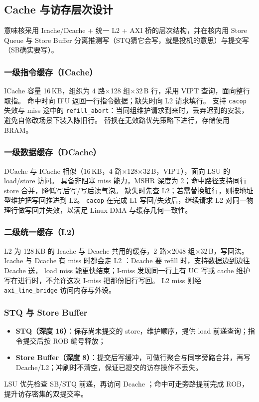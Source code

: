 \subsection{Cache 与访存层次设计}

意味核采用 Icache/Dcache + 统一 L2 + AXI 桥的层次结构，并在核内用 Store Queue 与 Store Buffer 分离推测写（STQ猜它会写，就是投机的意思）与提交写（SB确实要写）。

\subsubsection{一级指令缓存（ICache）}

ICache 容量 16\,KB，组织为 4 路$\times$128 组$\times$32\,B 行，采用 VIPT 查询，面向整行取指。
命中时向 IFU 返回一行指令数据；缺失时向 L2 请求填行。
支持 \texttt{cacop} 失效与 miss 途中的 \texttt{refill\_abort}：当同组维护请求到来时，丢弃迟到的安装，避免自修改场景下装入陈旧行。
替换在无效路优先策略下进行，存储使用 BRAM。

\subsubsection{一级数据缓存（DCache）}

DCache 与 ICache 相似（16\,KB，4 路$\times$128$\times$32\,B，VIPT），面向 LSU 的 load/store 访问。
具备非阻塞 miss 能力，MSHR 深度为 2；命中路径支持同行 store 合并，降低写后写/写后读气泡。
缺失时先查 L2；若需替换脏行，则按地址型维护把写回推进到 L2。
\texttt{cacop} 在完成 L1 写回/失效后，继续请求 L2 对同一物理行做写回并失效，以满足 Linux DMA 与缓存几何一致性。

\subsubsection{二级统一缓存（L2）}

L2 为 128\,KB 的 Icache 与 Dcache 共用的缓存，2 路$\times$2048 组$\times$32\,B，写回法。
Icache 与 Dcache 有 miss 时都会走 L2 ：Dcache 要 refill 时，支持数据边到边往 Dcache 送， load miss 能更快结束；I-miss 发现同一行上有 UC 写或 cache 维护写在进行时，不允许这次 I-miss 把那份旧行写回。
L2 miss 则经 \texttt{axi\_line\_bridge} 访问内存与外设。

\subsubsection{STQ 与 Store Buffer}

\begin{itemize}
  \item \textbf{STQ（深度 16）}：保存尚未提交的 store，维护顺序，提供 load 前递查询；指令提交后按 ROB 编号释放；
  \item \textbf{Store Buffer（深度 8）}：提交后写缓冲，可做行聚合与同字旁路合并，再写 Dcache/L2；冲刷时不清空，保证已提交的访存操作不丢失。
\end{itemize}

LSU 优先检查 SB/STQ 前递，再访问 Dcache ；命中可走旁路提前完成 ROB，提升访存密集的双提交率。
